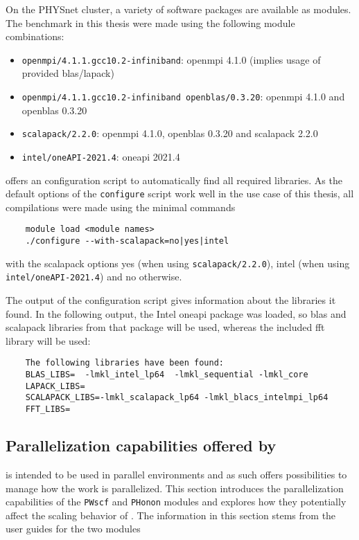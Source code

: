 \documentclass[main.tex]{subfiles}
\begin{document}
On the PHYSnet cluster, a variety of software packages are available as modules.
The benchmark in this thesis were made using the following module combinations:
\begin{itemize}
    \item \texttt{openmpi/4.1.1.gcc10.2-infiniband}: \gls{openmpi} 4.1.0 (implies usage of \QE provided \gls{blas}/\gls{lapack})
    \item \texttt{openmpi/4.1.1.gcc10.2-infiniband openblas/0.3.20}: \gls{openmpi} 4.1.0 and \gls{openblas} 0.3.20
    \item \texttt{scalapack/2.2.0}: \gls{openmpi} 4.1.0, \gls{openblas} 0.3.20 and \gls{scalapack} 2.2.0
    \item \texttt{intel/oneAPI-2021.4}: \gls{oneapi} 2021.4
\end{itemize}

\QE offers an configuration script to automatically find all required libraries.
As the default options of the \texttt{configure} script work well in the use case of this thesis, all compilations were made using the minimal commands
\begin{verbatim}
    module load <module names>
    ./configure --with-scalapack=no|yes|intel
\end{verbatim}
with the scalapack options yes (when using \texttt{scalapack/2.2.0}), intel (when using \\ \texttt{intel/oneAPI-2021.4}) and no otherwise.

The output of the configuration script gives information about the libraries it found.
In the following output, the Intel \gls{oneapi} package was loaded, so \gls{blas} and \gls{scalapack} libraries from that package will be used, whereas the included \gls{fft} library will be used:
\begin{verbatim}
    The following libraries have been found:
    BLAS_LIBS=  -lmkl_intel_lp64  -lmkl_sequential -lmkl_core
    LAPACK_LIBS=
    SCALAPACK_LIBS=-lmkl_scalapack_lp64 -lmkl_blacs_intelmpi_lp64
    FFT_LIBS= 
\end{verbatim}

\subsection{Parallelization capabilities offered by \QE}\label{sub:qe_parallelization}

\QE is intended to be used in parallel environments and as such offers possibilities to manage how the work is parallelized.
This section introduces the parallelization capabilities of the \texttt{PWscf} and \texttt{PHonon} modules and explores how they potentially affect the scaling behavior of \QE. The information in this section stems from the user guides for the two modules \cite{noauthor_pwscf_nodate, noauthor_phonon_nodate}
\end{document}
